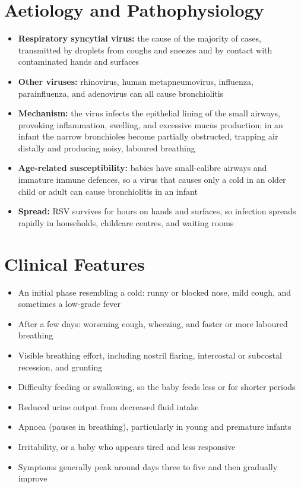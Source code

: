 \section*{Aetiology and Pathophysiology}
\begin{itemize}
    \item \textbf{Respiratory syncytial virus:} the cause of the majority of cases, transmitted by droplets from coughs and sneezes and by contact with contaminated hands and surfaces
    \item \textbf{Other viruses:} rhinovirus, human metapneumovirus, influenza, parainfluenza, and adenovirus can all cause bronchiolitis
    \item \textbf{Mechanism:} the virus infects the epithelial lining of the small airways, provoking inflammation, swelling, and excessive mucus production; in an infant the narrow bronchioles become partially obstructed, trapping air distally and producing noisy, laboured breathing
    \item \textbf{Age-related susceptibility:} babies have small-calibre airways and immature immune defences, so a virus that causes only a cold in an older child or adult can cause bronchiolitis in an infant
    \item \textbf{Spread:} RSV survives for hours on hands and surfaces, so infection spreads rapidly in households, childcare centres, and waiting rooms
\end{itemize}

\section*{Clinical Features}
\begin{itemize}
    \item An initial phase resembling a cold: runny or blocked nose, mild cough, and sometimes a low-grade fever
    \item After a few days: worsening cough, wheezing, and faster or more laboured breathing
    \item Visible breathing effort, including nostril flaring, intercostal or subcostal recession, and grunting
    \item Difficulty feeding or swallowing, so the baby feeds less or for shorter periods
    \item Reduced urine output from decreased fluid intake
    \item Apnoea (pauses in breathing), particularly in young and premature infants
    \item Irritability, or a baby who appears tired and less responsive
    \item Symptoms generally peak around days three to five and then gradually improve
\end{itemize}

